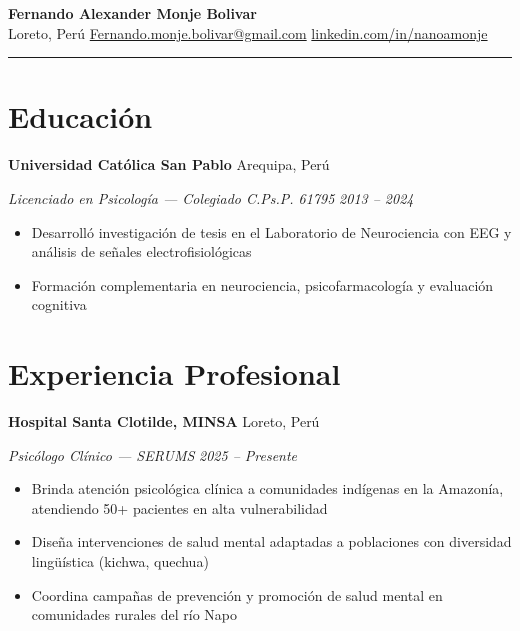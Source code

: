 \documentclass[11pt,letterpaper]{article}
\newcommand{\entry}[4]{%
  \noindent\textbf{#1} \hfill #2 \par\nopagebreak
  \textit{#3} \hfill \textit{#4} \par\nopagebreak
}
\begin{document}
\begin{center}
  {\Large\bfseries Fernando Alexander Monje Bolivar} \\[3pt]
  \enspace Loreto, Perú
  \quad{}\enspace \href{mailto:Fernando.monje.bolivar@gmail.com}{Fernando.monje.bolivar@gmail.com}
  \quad{}\enspace \href{https://linkedin.com/in/nanoamonje}{linkedin.com/in/nanoamonje}
\end{center}

\vspace{-0.4em}
\noindent\rule{\textwidth}{0.8pt}
\vspace{-0.6em}

\section{Educación}

\entry{Universidad Católica San Pablo}{Arequipa, Perú}{Licenciado en Psicología — Colegiado C.Ps.P. 61795}{2013 -- 2024}
\begin{itemize}
  \item Desarrolló investigación de tesis en el Laboratorio de Neurociencia con EEG y análisis de señales electrofisiológicas
  \item Formación complementaria en neurociencia, psicofarmacología y evaluación cognitiva
\end{itemize}
\vspace{0.2em}

\section{Experiencia Profesional}

\entry{Hospital Santa Clotilde, MINSA}{Loreto, Perú}{Psicólogo Clínico — SERUMS}{2025 -- Presente}
\begin{itemize}
  \item Brinda atención psicológica clínica a comunidades indígenas en la Amazonía, atendiendo 50+ pacientes en alta vulnerabilidad
  \item Diseña intervenciones de salud mental adaptadas a poblaciones con diversidad lingüística (kichwa, quechua)
  \item Coordina campañas de prevención y promoción de salud mental en comunidades rurales del río Napo
\end{itemize}
\vspace{0.2em}
\end{document}
